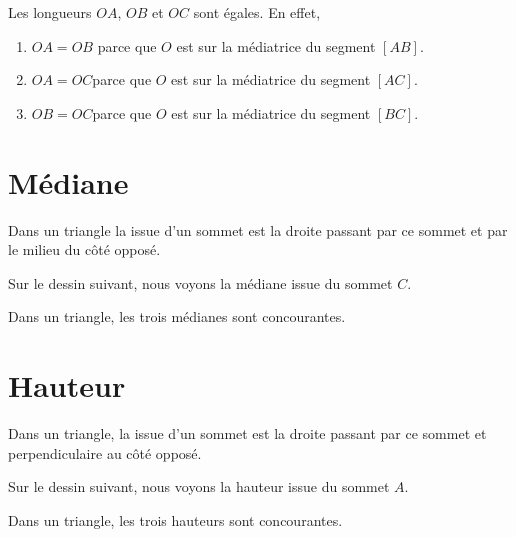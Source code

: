Les longueurs \( OA\), \( OB\) et \( OC\) sont égales. En effet,
\begin{enumerate}
    \item
        \( OA=OB\) parce que \( O\) est sur la médiatrice du segment \( [AB]\).
    \item
        \( OA=OC\)parce que \( O\) est sur la médiatrice du segment \( [AC]\).
    \item
        \( OB=OC\)parce que \( O\) est sur la médiatrice du segment \( [BC]\).
\end{enumerate}

\section{Médiane}

\begin{definition}
    Dans un triangle la  issue d'un sommet est la droite passant par ce sommet et par le milieu du côté opposé.
\end{definition}

Sur le dessin suivant, nous voyons la médiane issue du sommet \( C\).
\begin{center}
   
\end{center}

\begin{propriete}
    Dans un triangle, les trois médianes sont concourantes.
\end{propriete}

\begin{center}
   
\end{center}

\section{Hauteur}

\begin{definition}
    Dans un triangle, la  issue d'un sommet est la droite passant par ce sommet et perpendiculaire au côté opposé.
\end{definition}

Sur le dessin suivant, nous voyons la hauteur issue du sommet \( A\).

\begin{center}
   
\end{center}

\begin{propriete}
    Dans un triangle, les trois hauteurs sont concourantes.
\end{propriete}

\begin{center}
   
\end{center}

